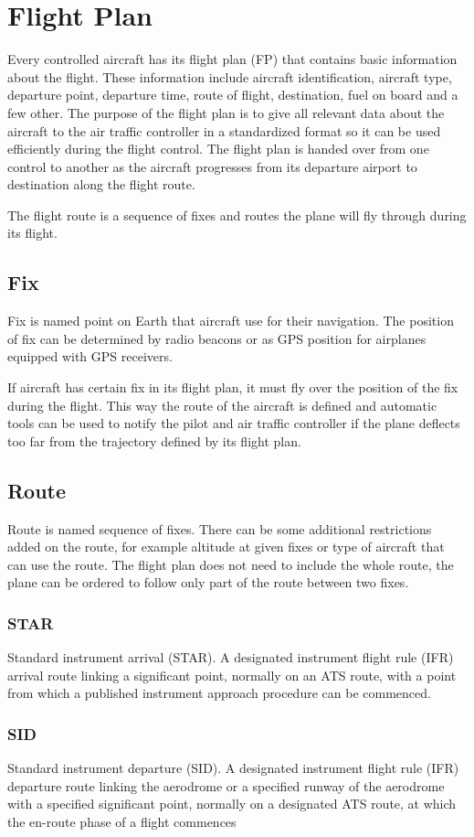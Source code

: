 
\section{Flight Plan}

Every controlled aircraft has its flight plan (FP) that contains basic information about the flight. These information include aircraft identification, aircraft type, departure point, departure time, route of flight, destination, fuel on board and a few other. \cite[Chapter 5]{aim} The purpose of the flight plan is to give all relevant data about the aircraft to the air traffic controller in a standardized format so it can be used efficiently during the flight control. The flight plan is handed over from one control to another as the aircraft progresses from its departure airport to destination along the flight route.

The flight route is a sequence of fixes and routes the plane will fly through during its flight.

\subsection{Fix}
Fix is named point on Earth that aircraft use for their navigation. The position of fix can be determined by radio beacons or as GPS position for airplanes equipped with GPS receivers.

If aircraft has certain fix in its flight plan, it must fly over the position of the fix during the flight. This way the route of the aircraft is defined and automatic tools can be used to notify the pilot and air traffic controller if the plane deflects too far from the trajectory defined by its flight plan.

\subsection{Route}
Route is named sequence of fixes. There can be some additional restrictions added on the route, for example altitude at given fixes or type of aircraft that can use the route. The flight plan does not need to include the whole route, the plane can be ordered to follow only part of the route between two fixes.

\subsubsection{STAR}
Standard instrument arrival (STAR). A designated instrument flight rule (IFR) arrival route linking a significant point,
normally on an ATS route, with a point from which a published instrument approach procedure can be commenced. \cite{doc4444}

\subsubsection{SID}
Standard instrument departure (SID). A designated instrument flight rule (IFR) departure route linking the aerodrome
or a specified runway of the aerodrome with a specified significant point, normally on a designated ATS route, at
which the en-route phase of a flight commences